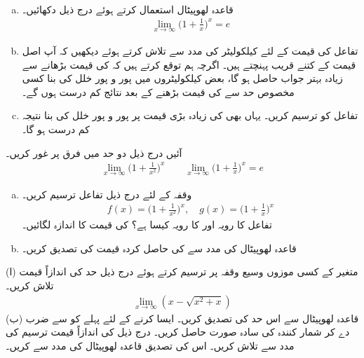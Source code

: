 \\
\begin{enumerate}[a.]
\item
قاعدہ لھوپیٹال استعمال کرتے ہوئے درج ذیل دکھائیں۔
\begin{align*}
\lim_{x\to\infty}\big(1+\frac{1}{x}\big)^x=e
\end{align*}
\item
تفاعل  کی قیمت  کے لئے کیلکولیٹر کی مدد سے تلاش کرتے ہوئے دیکھیں کہ آپ اصل قیمت  کے کتنے قریب پہنچتے ہیں۔ اگرچہ ہم توقع کرتے ہیں کہ  کی قیمت بڑھانے سے زیادہ بہتر جواب حاصل ہو گا، بعض کیلکولیٹروں  میں پور و پور خلل کی بنا کسی مخصوص حد سے  کی قیمت بڑھنے  کے بعد نتائج کم درست ہوں گے۔
\item
تفاعل  کو ترسیم کریں۔ یہاں بھی  کی زیادہ بڑی قیمت پر پور و پور خلل کی بنا نتیجہ کم درست ہو گا۔
\end{enumerate}
آئیں درج ذیل دو حد میں فرق پر غور کریں۔
\begin{align*}
\lim_{x\to\infty}\big(1+\frac{1}{x^2}\big)^x\quad \text{}\quad \lim_{x\to \infty}\big(1+\frac{1}{x}\big)^x=e
\end{align*}
\begin{enumerate}[a.]
\item
وقفہ  کے لئے درج ذیل تفاعل ترسیم کریں۔
\begin{align*}
f(x)=\big(1+\frac{1}{x^2}\big)^x,\quad g(x)=\big(1+\frac{1}{x}\big)^x
\end{align*}
 تفاعل  کا رویہ  اور  کا رویہ کیسا ہے؟  کی قیمت کا اندازہ لگائیں۔
\item
قاعدہ لھوپیٹال کی مدد سے  کی حاصل کردہ قیمت کی تصدیق کریں۔
\end{enumerate}
(ا) متغیر  کے کسی موزوں  وسیع وقفہ پر ترسیم کرتے ہوئے درج ذیل حد کی اندازاً قیمت تلاش کریں۔
\begin{align*}
\lim_{x\to \infty}(x-\sqrt{x^2+x})
\end{align*}
(ب) قاعدہ لھوپیٹال سے اس حد کی تصدیق کریں۔ ایسا کرنے کے لئے پہلے  کو  سے ضرب دے کر شمار کنندہ  کی سادہ صورت حاصل کریں۔
درج ذیل کی اندازاً قیمت ترسیم کی مدد سے تلاش کریں۔ اس کی تصدیق قاعدہ لھوپیٹال کی مدد سے کریں۔
